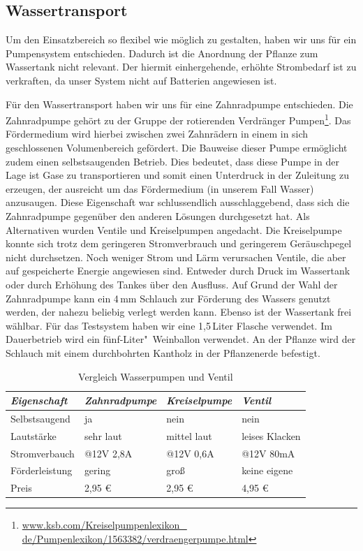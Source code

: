 \subsection{Wassertransport}
Um den Einsatzbereich so flexibel wie möglich zu gestalten, haben wir uns für ein Pumpensystem entschieden. 
Dadurch ist die Anordnung der Pflanze zum Wassertank nicht relevant. 
Der hiermit einhergehende, erhöhte Strombedarf ist zu verkraften, da unser System nicht auf Batterien angewiesen ist.

Für den Wassertransport haben wir uns für eine Zahnradpumpe entschieden.
Die Zahnradpumpe gehört zu der Gruppe der rotierenden Verdränger Pumpen\footnote{\href{http://www.ksb.com/Kreiselpumpenlexikon\_de/Pumpenlexikon/1563382/verdraengerpumpe.html}{www.ksb.com/Kreiselpumpenlexikon\_ \\ de/Pumpenlexikon/1563382/verdraengerpumpe.html}}.
Das Fördermedium wird hierbei zwischen zwei Zahnrädern in einem in sich geschlossenen Volumenbereich gefördert.
Die Bauweise dieser Pumpe ermöglicht zudem einen selbstsaugenden Betrieb. 
Dies bedeutet, dass diese Pumpe in der Lage ist Gase zu transportieren und somit einen Unterdruck in der Zuleitung zu erzeugen, der ausreicht um das Fördermedium (in unserem Fall Wasser) anzusaugen. 
Diese Eigenschaft war schlussendlich ausschlaggebend, dass sich die Zahnradpumpe gegenüber den anderen Lösungen durchgesetzt hat.
Als Alternativen wurden Ventile und Kreiselpumpen angedacht.
Die Kreiselpumpe konnte sich trotz dem geringeren Stromverbrauch und geringerem Geräuschpegel nicht durchsetzen. 
Noch weniger Strom und Lärm verursachen Ventile, die aber auf gespeicherte Energie angewiesen sind.  
Entweder durch Druck im Wassertank oder durch Erhöhung des Tankes über den Ausfluss. 
Auf Grund der Wahl der Zahnradpumpe kann ein 4\,mm Schlauch zur Förderung des Wassers genutzt werden, der nahezu beliebig verlegt werden kann.  
Ebenso ist der Wassertank frei wählbar. Für das Testsystem haben wir eine 1,5\,Liter Flasche verwendet. Im Dauerbetrieb wird ein fünf-Liter"~Weinballon verwendet. 
An der Pflanze wird der Schlauch mit einem durchbohrten Kantholz in der Pflanzenerde befestigt.

	
\begin{table}
	\centering
		\onehalfspacing
	\footnotesize
	\caption{Vergleich Wasserpumpen und Ventil}
	\label{Vergleich zwischen Wasserpumpen und Ventil}
		\begin{tabular}{|l|lll|}
		\hline
		\textit{Eigenschaft} & \textit{Zahnradpumpe} & \textit{Kreiselpumpe} & \textit{Ventil} \\
		\hline
		Selbstsaugend	&ja	&nein &nein\\		
		Lautstärke		&sehr laut	&mittel laut	&leises Klacken\\
		Stromverbauch	&@12V 2,8A	&@12V 0,6A	&@12V 80mA\\
		Förderleistung	&gering		&groß		&keine eigene\\
		Preis			&2,95 \euro	& 2,95 \euro	&	4,95 \euro\\
		\hline		
		\end{tabular}
		
\end{table}	
	
